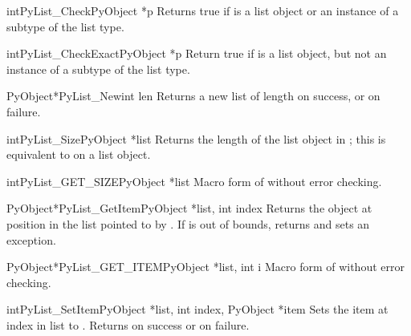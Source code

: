 \begin{cfuncdesc}{int}{PyList_Check}{PyObject *p}
  Returns true if  is a list object or an instance of a
  subtype of the list type.
\end{cfuncdesc}

\begin{cfuncdesc}{int}{PyList_CheckExact}{PyObject *p}
  Return true if  is a list object, but not an instance of a
  subtype of the list type.
\end{cfuncdesc}

\begin{cfuncdesc}{PyObject*}{PyList_New}{int len}
  Returns a new list of length  on success, or \NULL{} on
  failure.
\end{cfuncdesc}

\begin{cfuncdesc}{int}{PyList_Size}{PyObject *list}
  Returns the length of the list object in ; this is
  equivalent to  on a list object.
\end{cfuncdesc}

\begin{cfuncdesc}{int}{PyList_GET_SIZE}{PyObject *list}
  Macro form of  without error checking.
\end{cfuncdesc}

\begin{cfuncdesc}{PyObject*}{PyList_GetItem}{PyObject *list, int index}
  Returns the object at position  in the list pointed to by
  .  If  is out of bounds, returns \NULL{} and sets an
   exception.
\end{cfuncdesc}

\begin{cfuncdesc}{PyObject*}{PyList_GET_ITEM}{PyObject *list, int i}
  Macro form of  without error checking.
\end{cfuncdesc}

\begin{cfuncdesc}{int}{PyList_SetItem}{PyObject *list, int index,
                                       PyObject *item}
  Sets the item at index  in list to .  Returns
   on success or  on failure.  
\end{cfuncdesc}

